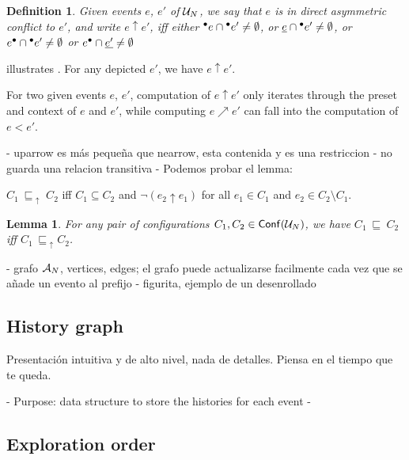 \documentclass[11pt,a4paper]{article}
\newtheorem{definition}{Definition}
\newtheorem{lemma}{Lemma}
\newcommand{\conf}[1]{\ensuremath{\mathsf{Conf}(#1)}}
\newcommand{\evolves}{{\ensuremath{\ \sqsubseteq \ }}}
\begin{document}
\begin{definition}
\label{def:direct.asymmetric}
Given events $e$, $e'$ of $\mathcal{U}_{N}$, we say that $e$ is in \emph{direct
asymmetric conflict} to $e'$, and write $e \uparrow e'$, iff either
${}^\bullet e \cap {}^\bullet e' \ne \emptyset$, or
$\underline{e} \cap {}^\bullet e' \ne \emptyset$, or
$e^\bullet \cap {}^\bullet e' \ne \emptyset$ or
$e^\bullet \cap \underline{e'} \ne \emptyset$
\end{definition}

 illustrates .  For any depicted $e'$, we
have $e \uparrow e'$.  

For two given events $e$, $e'$, computation of $e
\uparrow e'$ only iterates through the preset and context of $e$ and $e'$,
while computing $e \nearrow e'$ can fall into the computation of $e < e'$.


 - uparrow es más pequeña que nearrow, esta contenida y es una restriccion
 - no guarda una relacion transitiva
 - Podemos probar el lemma:

$C_1 \evolves_{\!\!\!\uparrow} \; C_2$ iff $C_1 \subseteq C_2$ and $\lnot (e_2
\uparrow e_1)$ for all $e_1 \in C_1$ and $e_2 \in C_2 \setminus C_1$.

\begin{lemma}
For any pair of configurations $C_1, C_2 \in \conf{\unf N}$, we have $C_1
\evolves C_2$ iff $C_1 \evolves_{\!\!\!\uparrow} C_2$.
\end{lemma}

 - grafo $\mathcal{A}_{N}$, vertices, edges; el grafo puede actualizarse facilmente cada
   vez que se añade un evento al prefijo
 - figurita, ejemplo de un desenrollado


\subsection{History graph}

Presentación intuitiva y de alto nivel, nada de detalles. Piensa en el tiempo
que te queda.

 - Purpose: data structure to store the histories for each event
 - 

\subsection{Exploration order}
\end{document}
